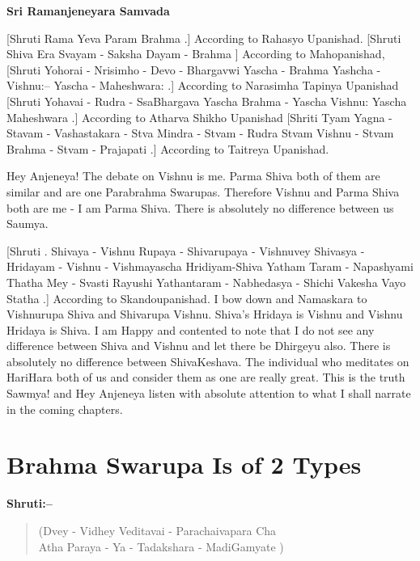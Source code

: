 \begin{center}
\textbf{Sri Ramanjeneyara Samvada}
\end{center}

[Shruti  Rama Yeva Param Brahma .] According to Rahasyo Upanishad. [Shruti  Shiva Era Svayam - Saksha Dayam - Brahma ] According to Mahopanishad, [Shruti  Yohorai - Nrisimho - Devo - Bhargavwi  Yascha - Brahma Yashcha - Vishnu:– Yascha - Maheshwara: .] According to Narasimha Tapinya Upanishad [Shruti  Yohavai - Rudra - SsaBhargava  Yascha Brahma - Yascha Vishnu: Yascha Maheshwara .] According to Atharva Shikho Upanishad [Shriti  Tyam Yagna - Stavam - Vashastakara - Stva Mindra - Stvam - Rudra Stvam Vishnu - Stvam Brahma - Stvam - Prajapati .] According to Taitreya Upanishad.

Hey Anjeneya! The debate on Vishnu is me. Parma Shiva both of them are similar and are one Parabrahma Swarupas. Therefore Vishnu and Parma Shiva both are me - I am Parma Shiva. There is absolutely no difference between us Saumya. 

[Shruti . Shivaya - Vishnu Rupaya - Shivarupaya - Vishnuvey  Shivasya - Hridayam - Vishnu - Vishmayascha Hridiyam-Shiva  Yatham Taram - Napashyami Thatha Mey - Svasti Rayushi  Yathantaram - Nabhedasya - Shichi Vakesha Vayo Statha .] According to Skandoupanishad. I bow down and Namaskara to Vishnurupa Shiva and Shivarupa Vishnu. Shiva's Hridaya is Vishnu and Vishnu Hridaya is Shiva. I am Happy and contented to note that I do not see any difference between Shiva and Vishnu and let there be Dhirgeyu also. There is absolutely no difference between ShivaKeshava. The individual who meditates on HariHara both of us and consider them as one are really great. This is the truth Sawmya! and Hey Anjeneya listen with absolute attention to what I shall narrate in the coming chapters.

\chapter{Brahma Swarupa Is of 2 Types}

\textbf{Shruti:–}

\begin{verse}
(Dvey - Vidhey Veditavai - Parachaivapara Cha \\ Atha Paraya - Ya - Tadakshara - MadiGamyate )
\end{verse}

